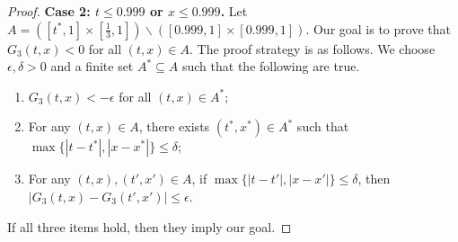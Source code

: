 \documentclass[11pt]{article}
\theoremstyle{definition}
\begin{document}
\begin{proof}
  \textbf{Case 2: $t\le 0.999$ or $x\le 0.999$.}
  Let $A = \left(\left[t^*,1\right]\times \left[\frac 13, 1\right]\right) \backslash \left([0.999,1] \times [0.999, 1]\right)$.
  Our goal is to prove that $G_3(t,x)<0$ for all $(t,x)\in A$.
  The proof strategy is as follows.
  We choose $\epsilon,\delta>0$ and a finite set $A^* \subseteq A$ such that the following are true.
  \begin{enumerate}[label=(\alph*)]
    \item \label{item:complete-bipartite:case-2:i} $G_3(t,x) < -\epsilon$ for all $(t,x)\in A^*$;
    \item \label{item:complete-bipartite:case-2:ii} For any $(t,x)\in A$, there exists $(t^*,x^*)\in A^*$ such that $\max\{|t-t^*|,|x-x^*|\}\le \delta$;
    \item \label{item:complete-bipartite:case-2:iii} For any $(t,x),(t',x')\in A$, if $\max\{|t-t'|,|x-x'|\}\le \delta$, then $|G_3(t,x)-G_3(t',x')|\le \epsilon$.
  \end{enumerate}
  If all three items hold, then they imply our goal.


\end{proof}
\end{document}

